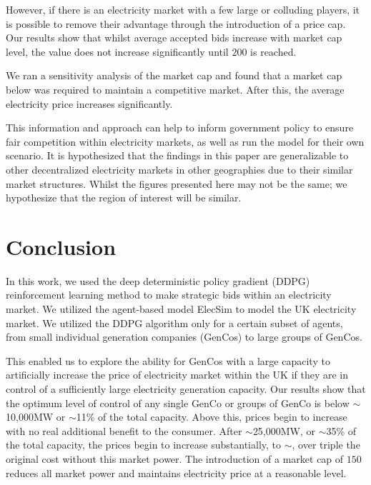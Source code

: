 \documentclass[conference]{IEEEtran}
\begin{document}
However, if there is an electricity market with a few large or colluding players, it is possible to remove their advantage through the introduction of a price cap. Our results show that whilst average accepted bids increase with market cap level, the value does not increase significantly until \textsterling$200$ is reached.

We ran a sensitivity analysis of the market cap and found that a market cap below  was required to maintain a competitive market. After this, the average electricity price increases significantly. 

This information and approach can help to inform government policy to ensure fair competition within electricity markets, as well as run the model for their own scenario. It is hypothesized that the findings in this paper are generalizable to other decentralized electricity markets in other geographies due to their similar market structures. Whilst the figures presented here may not be the same; we hypothesize that the region of interest will be similar.



\section{Conclusion}
\label{sec:conclusion}

In this work, we used the deep deterministic policy gradient (DDPG) reinforcement learning method to make strategic bids within an electricity market. We utilized the agent-based model ElecSim to model the UK electricity market. We utilized the DDPG algorithm only for a certain subset of agents, from small individual generation companies (GenCos) to large groups of GenCos. 

This enabled us to explore the ability for GenCos with a large capacity to artificially increase the price of electricity market within the UK if they are in control of a sufficiently large electricity generation capacity. Our results show that the optimum level of control of any single GenCo or groups of GenCo is below ${\sim}$10,000MW or ${\sim}$11\% of the total capacity. Above this, prices begin to increase with no real additional benefit to the consumer. After ${\sim}$25,000MW, or ${\sim}$35\% of the total capacity, the prices begin to increase substantially, to ${\sim}$, over triple the original cost without this market power. The introduction of a market cap of \textsterling$150$ reduces all market power and maintains electricity price at a reasonable level.
\end{document}
